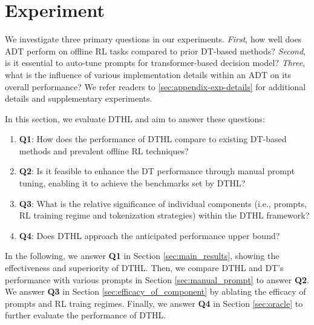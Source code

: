 \section{Experiment}

We investigate three primary questions in our experiments. 
\emph{First}, how well does ADT perform on offline RL tasks compared to prior DT-based methods? 
\emph{Second}, is it essential to auto-tune prompts for transformer-based decision model?  
\emph{Three}, what is the influence of various implementation details within an ADT on its overall performance?
We refer readers to \cref{sec:appendix-exp-details} for additional details and supplementary experiments.

In this section, we evaluate DTHL and aim to answer these questions: 
\begin{enumerate}[leftmargin=*,noitemsep,topsep=0pt]
\item[] \textbf{Q1}: How does the performance of DTHL compare to existing DT-based methods and prevalent offline RL techniques?
\item[] \textbf{Q2}: Is it feasible to enhance the DT performance through manual prompt tuning, enabling it to achieve the benchmarks set by DTHL?
\item[] \textbf{Q3}: What is the relative significance of individual components (i.e., prompts, RL training regime and tokenization strategies) within the DTHL framework?
\item[] \textbf{Q4}: Does DTHL approach the anticipated performance upper bound?
\end{enumerate}
% 
In the following, we answer \textbf{Q1} in Section \ref{sec:main_results}, showing the effectiveness and superiority of DTHL. Then, we compare DTHL and DT's performance with various prompts in Section  \ref{sec:manual_prompt} to answer \textbf{Q2}. We answer \textbf{Q3} in Section \ref{sec:efficacy_of_component} by ablating the efficacy of prompts and RL traing regimes. Finally, we answer \textbf{Q4} in Section \ref{sec:oracle} to further evaluate the performance of DTHL.

